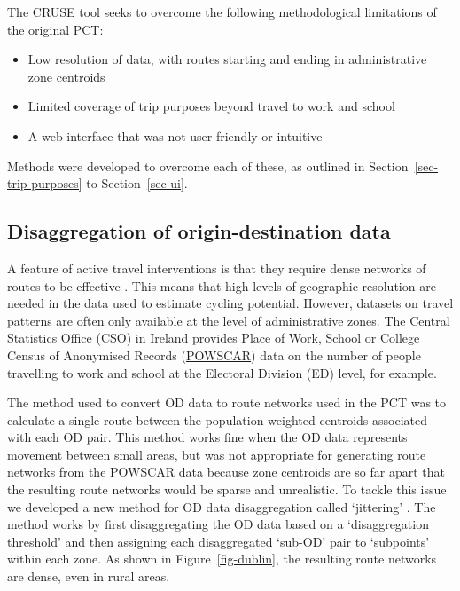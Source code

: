 \documentclass[
  super,
  preprint,
  3p]{elsarticle}
\providecommand{\tightlist}{%
  \setlength{\itemsep}{0pt}\setlength{\parskip}{0pt}}\usepackage{longtable,booktabs,array}
\begin{document}
The CRUSE tool seeks to overcome the following methodological
limitations of the original PCT:

\begin{itemize}
\tightlist
\item
  Low resolution of data, with routes starting and ending in
  administrative zone centroids
\item
  Limited coverage of trip purposes beyond travel to work and school
\item
  A web interface that was not user-friendly or intuitive
\end{itemize}

Methods were developed to overcome each of these, as outlined in
Section~\ref{sec-trip-purposes} to Section~\ref{sec-ui}.

\hypertarget{sec-disaggregation}{%
\subsection{Disaggregation of origin-destination
data}\label{sec-disaggregation}}

A feature of active travel interventions is that they require dense
networks of routes to be effective \citep{parkin2018}. This means that
high levels of geographic resolution are needed in the data used to
estimate cycling potential. However, datasets on travel patterns are
often only available at the level of administrative zones. The Central
Statistics Office (CSO) in Ireland provides Place of Work, School or
College Census of Anonymised Records
(\href{https://www.cso.ie/en/census/census2016reports/powscar/}{POWSCAR})
data on the number of people travelling to work and school at the
Electoral Division (ED) level, for example.

The method used to convert OD data to route networks used in the PCT was
to calculate a single route between the population weighted centroids
associated with each OD pair. This method works fine when the OD data
represents movement between small areas, but was not appropriate for
generating route networks from the POWSCAR data because zone centroids
are so far apart that the resulting route networks would be sparse and
unrealistic. To tackle this issue we developed a new method for OD data
disaggregation called `jittering' \citep{lovelace2022}. The method works
by first disaggregating the OD data based on a `disaggregation
threshold' and then assigning each disaggregated `sub-OD' pair to
`subpoints' within each zone. As shown in Figure~\ref{fig-dublin}, the
resulting route networks are dense, even in rural areas.
\end{document}
